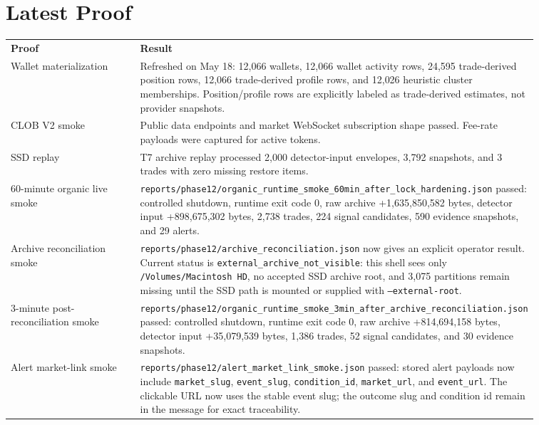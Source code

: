 \documentclass{article}
\begin{document}
\section*{Latest Proof}
\begin{longtable}{p{0.30\linewidth}p{0.56\linewidth}}
\textbf{Proof} & \textbf{Result} \\
Wallet materialization & Refreshed on May 18: 12{,}066 wallets, 12{,}066 wallet activity rows, 24{,}595 trade-derived position rows, 12{,}066 trade-derived profile rows, and 12{,}026 heuristic cluster memberships. Position/profile rows are explicitly labeled as trade-derived estimates, not provider snapshots. \\
CLOB V2 smoke & Public data endpoints and market WebSocket subscription shape passed. Fee-rate payloads were captured for active tokens. \\
SSD replay & T7 archive replay processed 2{,}000 detector-input envelopes, 3{,}792 snapshots, and 3 trades with zero missing restore items. \\
60-minute organic live smoke & \texttt{reports/phase12/organic\_runtime\_smoke\_60min\_after\_lock\_hardening.json} passed: controlled shutdown, runtime exit code 0, raw archive +1{,}635{,}850{,}582 bytes, detector input +898{,}675{,}302 bytes, 2{,}738 trades, 224 signal candidates, 590 evidence snapshots, and 29 alerts. \\
Archive reconciliation smoke & \texttt{reports/phase12/archive\_reconciliation.json} now gives an explicit operator result. Current status is \texttt{external\_archive\_not\_visible}: this shell sees only \texttt{/Volumes/Macintosh HD}, no accepted SSD archive root, and 3{,}075 partitions remain missing until the SSD path is mounted or supplied with \texttt{--external-root}. \\
3-minute post-reconciliation smoke & \texttt{reports/phase12/organic\_runtime\_smoke\_3min\_after\_archive\_reconciliation.json} passed: controlled shutdown, runtime exit code 0, raw archive +814{,}694{,}158 bytes, detector input +35{,}079{,}539 bytes, 1{,}386 trades, 52 signal candidates, and 30 evidence snapshots. \\
Alert market-link smoke & \texttt{reports/phase12/alert\_market\_link\_smoke.json} passed: stored alert payloads now include \texttt{market\_slug}, \texttt{event\_slug}, \texttt{condition\_id}, \texttt{market\_url}, and \texttt{event\_url}. The clickable URL now uses the stable event slug; the outcome slug and condition id remain in the message for exact traceability. \\

\end{longtable}
\end{document}
